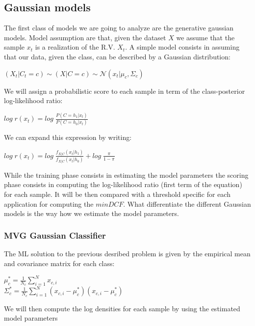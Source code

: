 \documentclass[10pt, a4paper, twocolumn]{article} %
\begin{document}
\subsection{Gaussian models}
The first class of models we are going to analyze are the generative gaussian models. Model assumption are that,
given the dataset $X$ we assume that the sample $x_{t}$ is a realization of the R.V. $X_{t}$. A simple
model consists in assuming that our data, given the class, can be described by a Gaussian distribution:
\begin{center}
	\begin{math}
		(X_{t}|C_{t}=c) \sim (X|C=c) \sim \mathcal{N} (x_{t}|\mu_{c},\Sigma_{c})
	\end{math}
\end{center}
We will assign a probabilistic score to each sample in term of the class-posterior 
log-likelihood ratio:
\begin{center}
	\begin{math}
		log\;r(x_{t}) = log\;\frac{P(C = h_{1}|x_{t})}{P(C = h_{0}|x_{t})}
	\end{math}
\end{center}
We can expand this expression by writing:
\begin{center}
	\begin{math}
		log\;r(x_{t}) = log\;\frac{f_{X|C}(x_{t}|h_{1})}{f_{X|C}(x_{t}|h_{0})} + log\;\frac{\pi}{1-\pi}
	\end{math}
\end{center}
While the training phase consists in estimating the model parameters the scoring phase
consists in computing the log-likelihood ratio (first term of the equation) for each sample. 
It will be then compared with  a threshold specific for each application for computing 
the $minDCF$. What differentiate the different Gaussian models is the way how we estimate the
model parameters.
\subsubsection{MVG Gaussian Classifier}
The ML solution to the previous desribed problem is given by the empirical mean and covariance
matrix for each class:
\begin{center}
	$\mu_{c}^* = \frac{1}{N_c}\sum_{i=1}^{N}x_{c,i}$ \\
	$\Sigma_c^* = \frac{1}{N_c}\sum_{i=1}^{N}(x_{c,i}-\mu_c^*)(x_{c,i}-\mu_c^*)$
\end{center}
We will then compute the log densities for each sample by using the estimated model parameters
\end{document}
